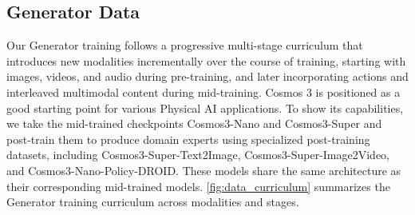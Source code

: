 \subsection{Generator Data}
\label{subsec::data_generator}

Our Generator training follows a progressive multi-stage curriculum that introduces new modalities incrementally over the course of training, starting with images, videos, and audio during pre-training, and later incorporating actions and interleaved multimodal content during mid-training. Cosmos 3 is positioned as a good starting point for various Physical AI applications. To show its capabilities, we take the mid-trained checkpoints Cosmos3-Nano and Cosmos3-Super and post-train them to produce domain experts using specialized post-training datasets, including Cosmos3-Super-Text2Image, Cosmos3-Super-Image2Video, and Cosmos3-Nano-Policy-DROID. These models share the same architecture as their corresponding mid-trained models. \cref{fig:data_curriculum} summarizes the Generator training curriculum across modalities and stages.






